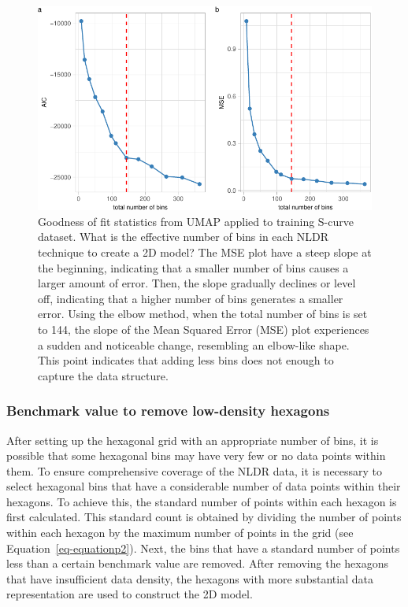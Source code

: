 \documentclass[
  12pt]{article}
\begin{document}
\begin{figure}

{\centering \includegraphics{paper_files/figure-pdf/fig-diagnosticpltScurve-1.pdf}

}

\caption{\label{fig-diagnosticpltScurve}Goodness of fit statistics from
UMAP applied to training S-curve dataset. What is the effective number
of bins in each NLDR technique to create a 2D model? The MSE plot have a
steep slope at the beginning, indicating that a smaller number of bins
causes a larger amount of error. Then, the slope gradually declines or
level off, indicating that a higher number of bins generates a smaller
error. Using the elbow method, when the total number of bins is set to
144, the slope of the Mean Squared Error (MSE) plot experiences a sudden
and noticeable change, resembling an elbow-like shape. This point
indicates that adding less bins does not enough to capture the data
structure.}

\end{figure}

\hypertarget{benchmark-value-to-remove-low-density-hexagons}{%
\subsubsection{Benchmark value to remove low-density
hexagons}\label{benchmark-value-to-remove-low-density-hexagons}}

After setting up the hexagonal grid with an appropriate number of bins,
it is possible that some hexagonal bins may have very few or no data
points within them. To ensure comprehensive coverage of the NLDR data,
it is necessary to select hexagonal bins that have a considerable number
of data points within their hexagons. To achieve this, the standard
number of points within each hexagon is first calculated. This standard
count is obtained by dividing the number of points within each hexagon
by the maximum number of points in the grid (see
Equation~\ref{eq-equationp2}). Next, the bins that have a standard
number of points less than a certain benchmark value are removed. After
removing the hexagons that have insufficient data density, the hexagons
with more substantial data representation are used to construct the 2D
model.
\end{document}
